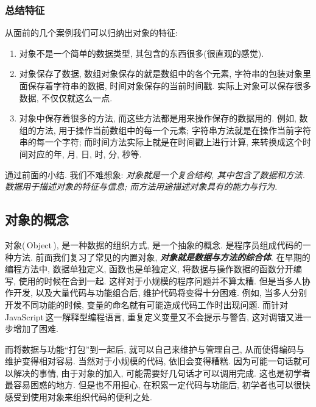 \subsubsection{总结特征}

从面前的几个案例我们可以归纳出对象的特征:

\begin{enumerate}
\item 对象不是一个简单的数据类型, 其包含的东西很多(很直观的感觉).
\item 对象保存了数据, 数组对象保存的就是数组中的各个元素, 字符串的包装对象里面保存着字符串的数据, 时间对象保存的当前时间戳. 
        实际上对象可以保存很多数据, 不仅仅就这么一点.
\item 对象中保存着很多的方法, 而这些方法都是用来操作保存的数据用的. 例如, 数组的方法, 用于操作当前数组中的每一个元素; 
        字符串方法就是在操作当前字符串的每一个字符; 而时间方法实际上就是在时间戳上进行计算, 来转换成这个时间对应的年, 
        月, 日, 时, 分, 秒等.
\end{enumerate}

通过前面的小结. 我们不难想象: {\em 对象就是一个复合结构, 其中包含了数据和方法. 数据用于描述对象的特征与信息; 
而方法用途描述对象具有的能力与行为}. 






\subsection{对象的概念}

对象(\,Object\,), 是一种数据的组织方式, 是一个抽象的概念. 是程序员组成代码的一种方法. 
前面我们复习了常见的内置对象, \textbf{\emph{对象就是数据与方法的综合体}}. 在早期的编程方法中,
数据单独定义, 函数也是单独定义, 将数据与操作数据的函数分开编写, 使用的时候在合到一起. 
这样对于小规模的程序问题并不算太糟. 但是当多人协作开发, 以及大量代码与功能组合后, 维护代码将变得十分困难.
例如, 当多人分别开发不同功能的时候, 变量的命名就有可能造成代码工作时出现问题. 
而针对\,JavaScript\,这一解释型编程语言, 重复定义变量又不会提示与警告, 这对调错又进一步增加了困难.

而将数据与功能``打包''到一起后, 就可以自己来维护与管理自己, 从而使得编码与维护变得相对容易. 
当然对于小规模的代码, 依旧会变得糟糕. 因为可能一句话就可以解决的事情, 由于对象的加入, 
可能需要好几句话才可以调用完成. 这也是初学者最容易困惑的地方. 但是也不用担心, 在积累一定代码与功能后, 
初学者也可以很快感受到使用对象来组织代码的便利之处. 

